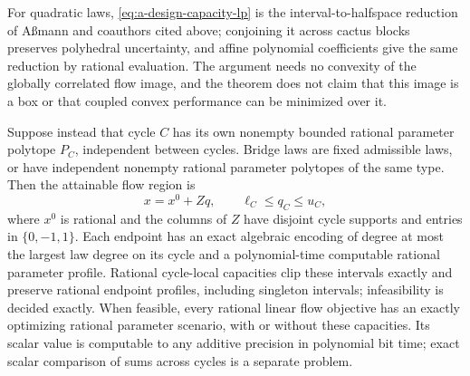 For quadratic laws, \eqref{eq:a-design-capacity-lp} is the
interval-to-halfspace reduction of A\ss mann and coauthors cited above;
conjoining it across cactus blocks preserves polyhedral uncertainty, and
affine polynomial coefficients give the same reduction by rational
evaluation.  The argument needs no convexity of the globally correlated
flow image, and the theorem does not claim that this image is a box or
that coupled convex performance can be minimized over it.

\begin{theorem}
\label{thm:a-design-independent}
Suppose instead that cycle $C$ has its own nonempty bounded rational
parameter polytope $P_C$, independent between cycles.  Bridge laws
are fixed admissible laws, or have independent nonempty rational
parameter polytopes of the same type.  Then the attainable flow region
is
\begin{equation}
 x=x^0+Zq,\qquad \ell_C\le q_C\le u_C,
 \label{eq:a-design-box}
\end{equation}
where $x^0$ is rational and the columns of $Z$ have disjoint cycle
supports and entries in $\{0,-1,1\}$.  Each endpoint has an exact
algebraic encoding of degree at most the largest law degree on its
cycle and a polynomial-time computable rational parameter profile.
Rational cycle-local capacities clip these intervals exactly and
preserve rational endpoint profiles, including singleton intervals;
infeasibility is decided exactly.  When feasible, every rational
linear flow objective has an exactly optimizing
rational parameter scenario, with or without these capacities.
Its scalar value is computable to any additive precision in polynomial
bit time; exact scalar comparison of sums across cycles is a separate
problem.
\end{theorem}

